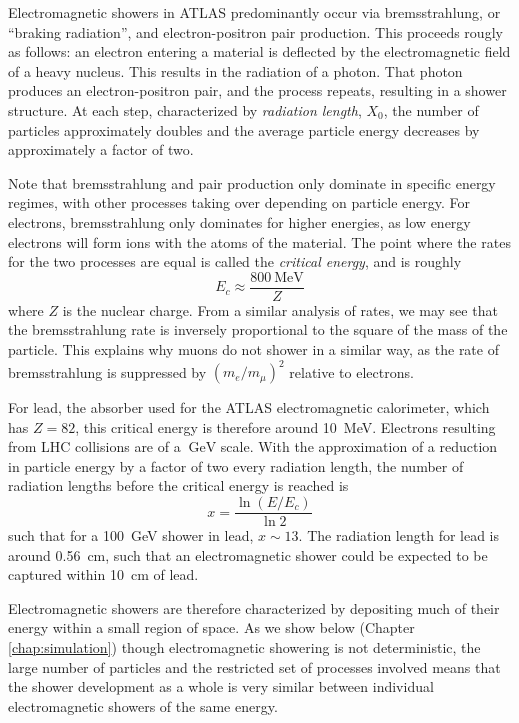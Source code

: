 Electromagnetic showers in ATLAS predominantly occur via bremsstrahlung, or ``braking radiation'', and electron-positron 
pair production. This proceeds rougly as follows: an electron entering a material is deflected by the electromagnetic 
field of a heavy nucleus. This results in the radiation of a photon. That photon produces an electron-positron 
pair, and the process repeats, resulting in a shower structure. At each step, characterized by 
\emph{radiation length}, $X_{0}$, the number of particles approximately doubles and the average particle 
energy decreases by approximately a factor of two. 

Note that bremsstrahlung and pair production only dominate in specific energy regimes, with other processes 
taking over depending on particle energy. For electrons, bremsstrahlung only dominates for higher energies,  
as low energy electrons will form ions with the atoms of the material. The point where the rates for the 
two processes are equal is called the \emph{critical energy}, and is roughly
\begin{equation}
E_{c} \approx \frac{\SI{800}{\MeV}}{Z}
\end{equation}
where $Z$ is the nuclear charge. From a similar analysis of rates, we may see that the bremsstrahlung 
rate is inversely proportional to the square of the mass of the particle. This explains why muons do not 
shower in a similar way, as the rate of bremsstrahlung is suppressed by $(m_{e}/m_{\mu})^2$ relative to electrons.

For lead, the absorber used for the ATLAS electromagnetic calorimeter, which has $Z=82$, this critical energy 
is therefore around \SI{10}{\MeV}. Electrons resulting from LHC collisions are of a $\SI{}{\GeV}$ scale. 
With the approximation of a reduction in particle energy by a factor of two every radiation length, the number of radiation lengths before the critical energy is reached is 
\begin{equation}
x = \frac{\ln{(E/E_{c})}}{\ln{2}}
\end{equation}
such that for a \SI{100}{\GeV} shower in lead, $x\sim 13$. The radiation length for lead is around \SI{0.56}{\cm},
such that an electromagnetic shower could be expected to be captured within \SI{10}{\cm} of lead. 

Electromagnetic showers are therefore characterized by depositing much of their energy within a small region 
of space. As we show below (Chapter \ref{chap:simulation}) though electromagnetic showering is not deterministic, 
the large number of particles and the restricted set of processes involved means that the shower development as a whole 
is very similar between individual electromagnetic showers of the same energy.

